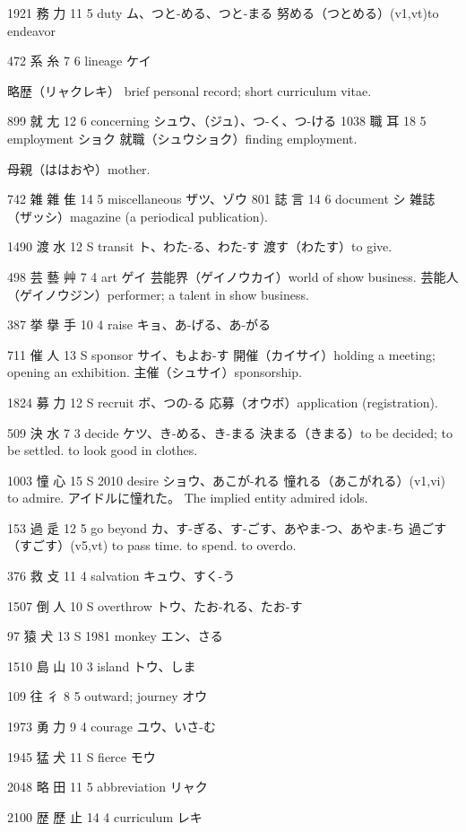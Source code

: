 1921	務		力	11	5		duty	ム、つと-める、つと-まる
努める（つとめる）(v1,vt)to endeavor

472	系		糸	7	6		lineage	ケイ

略歴（リャクレキ）
brief personal record;
short curriculum vitae.

899	就		尢	12	6		concerning	シュウ、（ジュ）、つ-く、つ-ける
1038	職		耳	18	5		employment	ショク
就職（シュウショク）finding employment.

母親（ははおや）mother.

742	雑	雜	隹	14	5		miscellaneous	ザツ、ゾウ
801	誌		言	14	6		document	シ
雑誌（ザッシ）magazine (a periodical publication).

1490	渡		水	12	S		transit	ト、わた-る、わた-す
渡す（わたす）to give.

498	芸	藝	艸	7	4		art	ゲイ
芸能界（ゲイノウカイ）world of show business.
芸能人（ゲイノウジン）performer; a talent in show business.

387	挙	擧	手	10	4		raise	キョ、あ-げる、あ-がる

711	催		人	13	S		sponsor	サイ、もよお-す
開催（カイサイ）holding a meeting; opening an exhibition.
主催（シュサイ）sponsorship.

1824	募		力	12	S		recruit	ボ、つの-る
応募（オウボ）application (registration).

509	決		水	7	3		decide	ケツ、き-める、き-まる
決まる（きまる）to be decided; to be settled. to look good in clothes.

1003	憧		心	15	S	2010	desire	ショウ、あこが-れる
憧れる（あこがれる）(v1,vi) to admire.
アイドルに憧れた。
The implied entity admired idols.

153	過		辵	12	5		go beyond	カ、す-ぎる、す-ごす、あやま-つ、あやま-ち
過ごす（すごす）(v5,vt) to pass time. to spend. to overdo.

376	救		攴	11	4		salvation	キュウ、すく-う

1507	倒		人	10	S		overthrow	トウ、たお-れる、たお-す

97	猿		犬	13	S	1981	monkey	エン、さる

1510	島		山	10	3		island	トウ、しま

109	往		彳	8	5		outward; journey	オウ

1973	勇		力	9	4		courage	ユウ、いさ-む

1945	猛		犬	11	S		fierce	モウ

2048	略		田	11	5		abbreviation	リャク

2100	歴	歷	止	14	4		curriculum	レキ

